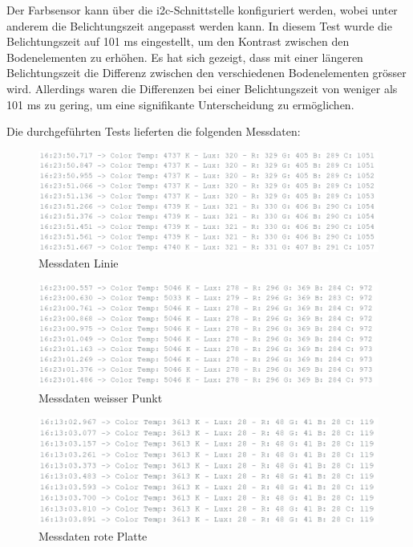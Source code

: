 \documentclass[../main.tex]{subfiles}
\begin{document}
Der Farbsensor kann über die \gls{i2c}-Schnittstelle konfiguriert werden, wobei unter anderem die Belichtungszeit angepasst werden kann. In diesem Test wurde die Belichtungszeit auf 101 ms eingestellt, um den Kontrast zwischen den Bodenelementen zu erhöhen. Es hat sich gezeigt, dass mit einer längeren Belichtungszeit die Differenz zwischen den verschiedenen Bodenelementen grösser wird. Allerdings waren die Differenzen bei einer Belichtungszeit von weniger als 101 ms zu gering, um eine signifikante Unterscheidung zu ermöglichen.

Die durchgeführten Tests lieferten die folgenden Messdaten:

\begin{figure}[H]
    \centering
    \includegraphics[width=\textwidth]{img/sensortest/MD_Linie_101ms.png}
    \caption{Messdaten Linie}
    \label{fig:MD_FarbsensorLinie}
\end{figure}

\begin{figure}[H]
    \centering
    \includegraphics[width=\textwidth]{img/sensortest/MD_WeisserPunkt_101ms.png}
    \caption{Messdaten weisser Punkt}
    \label{fig:MDFarbsensorWeisserPunkt}
\end{figure}

\begin{figure}[H]
    \centering
    \includegraphics[width=\textwidth]{img/sensortest/MD_RotePlatte_101ms.png}
    \caption{Messdaten rote Platte}
    \label{fig:MDFarbsensorPlatte}
\end{figure}
\end{document}

